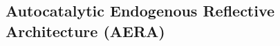 \documentclass[runningheads]{llncs}
\begin{document}


\subsection{Autocatalytic Endogenous Reflective Architecture (AERA)}

\end{document}
